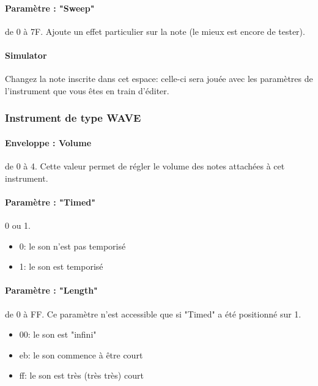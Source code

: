 \documentclass[12pt,a4paper]{article}
\begin{document}
            \paragraph{Paramètre : "Sweep"} de 0 à 7F. Ajoute un effet particulier sur la note (le mieux est encore de tester).

            \paragraph{Simulator} Changez la note inscrite dans cet espace: celle-ci sera jouée avec les paramètres de l'instrument que vous êtes en train d'éditer.

        \subsubsection{Instrument de type WAVE}


        \paragraph{Enveloppe : Volume} de 0 à 4. Cette valeur permet de régler le volume des notes attachées à cet instrument.

        \paragraph{Paramètre : "Timed"} 0 ou 1.
        \begin{itemize}
                \item{0: le son n'est pas temporisé}
                \item{1: le son est temporisé}
            \end{itemize}

        \paragraph{Paramètre : "Length"} de 0 à FF. Ce paramètre n'est accessible que si "Timed" a été positionné sur 1.
        \begin{itemize}
                \item{00: le son est "infini"}
                \item{eb: le son commence à être court}
                \item{ff: le son est très (très très) court}
            \end{itemize}
\end{document}
